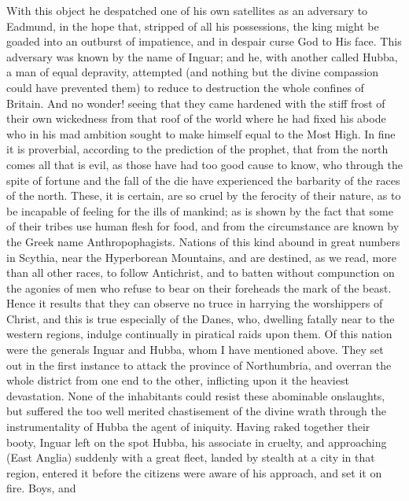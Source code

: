 \documentclass[10pt]{book}
\begin{document}
\begin{paracol}{2}
\begin{otherlanguage}{latin}
\end{otherlanguage}

\switchcolumn

With this object he despatched one of his own satellites as an adversary to Eadmund, in the hope that, stripped of all his possessions, the king might be goaded into an outburst of impatience, and in despair curse God to His face. This adversary was known by the name of Inguar; and he, with another called Hubba, a man of equal depravity, attempted (and nothing but the divine compassion could have prevented them) to reduce to destruction the whole confines of Britain. And no wonder! seeing that they came hardened with the stiff frost of their own wickedness from that roof of the world where he had fixed his abode who in his mad ambition sought to make himself equal to the Most High. In fine it is proverbial, according to the prediction of the prophet, that from the north comes all that is evil, as those have had too good cause to know, who through the spite of fortune and the fall of the die have experienced the barbarity of the races of the north. These, it is certain, are so cruel by the ferocity of their nature, as to be incapable of feeling for the ills of mankind; as is shown by the fact that some of their tribes use human flesh for food, and from the circumstance are known by the Greek name Anthropophagists. Nations of this kind abound in great numbers in Scythia, near the Hyperborean Mountains, and are destined, as we read, more than all other races, to follow Antichrist, and to batten without compunction on the agonies of men who refuse to bear on their foreheads the mark of the beast. Hence it results that they can observe no truce in harrying the worshippers of Christ, and this is true especially of the Danes, who, dwelling fatally near to the western regions, indulge continually in piratical raids upon them. Of this nation were the generals Inguar and Hubba, whom I have mentioned above. They set out in the first instance to attack the province of Northumbria, and overran the whole district from one end to the other, inflicting upon it the heaviest devastation. None of the inhabitants could resist these abominable onslaughts, but suffered the too well merited chastisement of the divine wrath through the instrumentality of Hubba the agent of iniquity. Having raked together their booty, Inguar left on the spot Hubba, his associate in cruelty, and approaching (East Anglia) suddenly with a great fleet, landed by stealth at a city in that region, entered it before the citizens were aware of his approach, and set it on fire. Boys, and\linebreak{}

\end{paracol}
\end{document}
